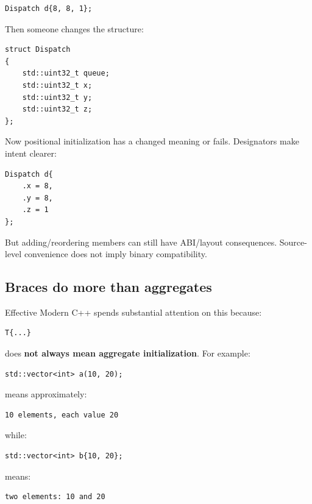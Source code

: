 \begin{verbatim}
Dispatch d{8, 8, 1};
\end{verbatim}

Then someone changes the structure:

\begin{verbatim}
struct Dispatch
{
    std::uint32_t queue;
    std::uint32_t x;
    std::uint32_t y;
    std::uint32_t z;
};
\end{verbatim}

Now positional initialization has a changed meaning or fails. Designators make intent clearer:

\begin{verbatim}
Dispatch d{
    .x = 8,
    .y = 8,
    .z = 1
};
\end{verbatim}

But adding/reordering members can still have ABI/layout consequences. Source-level convenience does not imply binary compatibility.

\subsection{Braces do more than aggregates}\label{01-foundations-i-ch003-braces-do-more-than-aggregates}

\hypertarget{01-foundations-i-ch003-braces-do-more-than-aggregates}{}

Effective Modern C++ spends substantial attention on this because:

\begin{verbatim}
T{...}
\end{verbatim}

does \textbf{not always mean aggregate initialization}. For example:

\begin{verbatim}
std::vector<int> a(10, 20);
\end{verbatim}

means approximately:

\begin{verbatim}
10 elements, each value 20
\end{verbatim}

while:

\begin{verbatim}
std::vector<int> b{10, 20};
\end{verbatim}

means:

\begin{verbatim}
two elements: 10 and 20
\end{verbatim}

